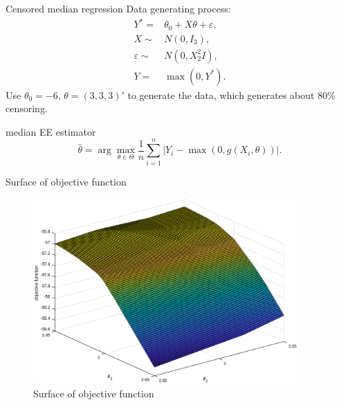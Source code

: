 \documentclass{beamer}
\begin{document}
\begin{frame}{Censored median regression}
    Data generating process:
    \begin{align*}
        Y^{*} = & \theta_0 + X\theta + \varepsilon, \\ 
      X  \sim &N(0,I_3), \\
      \varepsilon  \sim & N(0,X_2^2I), \\
      Y  = & \max(0,Y^{*}).
    \end{align*}
    Use $\theta_0 = -6$, $\theta = (3,3,3)'$ to generate the data, which generates about 80\% censoring.
    \begin{block}{median EE estimator}
        \begin{equation*}
            \hat{\theta} =  \arg\max_{\theta\in\Theta}\frac{1}{n}\sum\limits_{i=1}^n|Y_i-\max(0,g(X_i,\theta))|.
        \end{equation*}
    \end{block}
\end{frame}

\begin{frame}{Surface of objective function}
\begin{figure}[hp]
    \centering
    \includegraphics[width=0.9\textwidth]{figures/mesh.eps}
    \caption{Surface of objective function}
    \label{fig:lte-mean}
\end{figure}
\end{frame}
\end{document}

